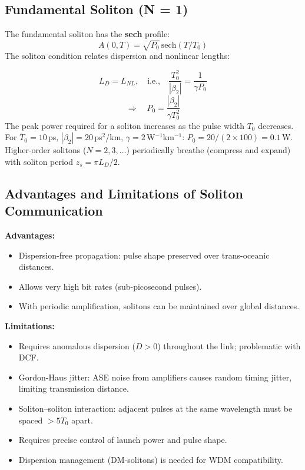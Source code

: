 \documentclass[12pt,a4paper]{article}
\begin{document}
\subsection{Fundamental Soliton (N = 1)}
The fundamental soliton has the \textbf{sech} profile:
\[
A(0,T) = \sqrt{P_0}\,\text{sech}(T/T_0)
\]
The soliton condition relates dispersion and nonlinear lengths:
\begin{tcolorbox}[formulabox, title={\textbf{Soliton Condition and Width-Power Relation}}]
\[
L_D = L_{NL}, \quad \text{i.e.,} \quad \frac{T_0^2}{|\beta_2|} = \frac{1}{\gamma P_0}
\]
\[
\Rightarrow \quad P_0 = \frac{|\beta_2|}{\gamma T_0^2}
\]
The peak power required for a soliton increases as the pulse width $T_0$ decreases. For $T_0 = 10$\,ps, $|\beta_2| = 20$\,ps$^2$/km, $\gamma = 2$\,W$^{-1}$km$^{-1}$: $P_0 = 20/(2\times100) = 0.1$\,W.\\
Higher-order solitons ($N = 2, 3, \ldots$) periodically breathe (compress and expand) with soliton period $z_s = \pi L_D / 2$.
\end{tcolorbox}

\subsection{Advantages and Limitations of Soliton Communication}
\textbf{Advantages:}
\begin{itemize}[leftmargin=*, itemsep=2pt]
  \item Dispersion-free propagation: pulse shape preserved over trans-oceanic distances.
  \item Allows very high bit rates (sub-picosecond pulses).
  \item With periodic amplification, solitons can be maintained over global distances.
\end{itemize}

\textbf{Limitations:}
\begin{itemize}[leftmargin=*, itemsep=2pt]
  \item Requires anomalous dispersion ($D > 0$) throughout the link; problematic with DCF.
  \item Gordon-Haus jitter: ASE noise from amplifiers causes random timing jitter, limiting transmission distance.
  \item Soliton--soliton interaction: adjacent pulses at the same wavelength must be spaced $>5T_0$ apart.
  \item Requires precise control of launch power and pulse shape.
  \item Dispersion management (DM-solitons) is needed for WDM compatibility.
\end{itemize}
\end{document}
